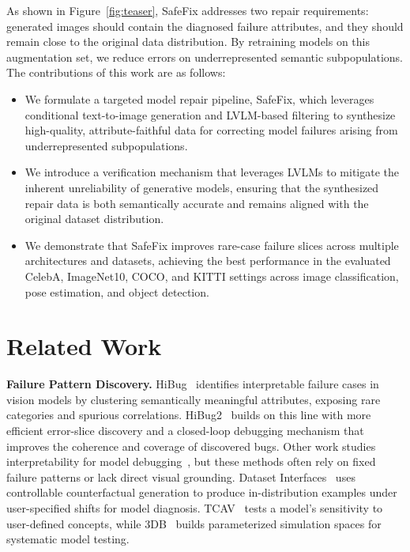 \documentclass[10pt]{article} %
\newcommand{\model}{SafeFix\xspace}
\newcommand{\hibug}{HiBug\xspace}
\begin{document}
As shown in Figure~\ref{fig:teaser}, \model addresses two repair requirements: generated images should contain the diagnosed failure attributes, and they should remain close to the original data distribution. By retraining models on this augmentation set, we reduce errors on underrepresented semantic subpopulations. The contributions of this work are as follows:
\begin{itemize}
\item We formulate a targeted model repair pipeline, \model, which leverages conditional text-to-image generation and LVLM-based filtering to synthesize high-quality, attribute-faithful data for correcting model failures arising from underrepresented subpopulations.

\item We introduce a verification mechanism that leverages LVLMs to mitigate the inherent unreliability of generative models, ensuring that the synthesized repair data is both semantically accurate and remains aligned with the original dataset distribution.

\item We demonstrate that \model{} improves rare-case failure slices across multiple architectures and datasets, achieving the best performance in the evaluated CelebA, ImageNet10, COCO, and KITTI settings across image classification, pose estimation, and object detection.
\end{itemize}

\section{Related Work}
\textbf{Failure Pattern Discovery.} \hibug~\citep{chen2023hibug} identifies interpretable failure cases in vision models by clustering semantically meaningful attributes, exposing rare categories and spurious correlations.
HiBug2~\citep{chen2025hibug2} builds on this line with more efficient error-slice discovery and a closed-loop debugging mechanism that improves the coherence and coverage of discovered bugs.
Other work studies interpretability for model debugging~\citep{adebayo2020debugging, adebayo2022posthoc}, but these methods often rely on fixed failure patterns or lack direct visual grounding.
Dataset Interfaces~\citep{vendrow2023dataset} uses controllable counterfactual generation to produce in-distribution examples under user-specified shifts for model diagnosis.
TCAV~\citep{kim2018tcav} tests a model's sensitivity to user-defined concepts, while 3DB~\citep{leclerc20223db} builds parameterized simulation spaces for systematic model testing.
\end{document}

